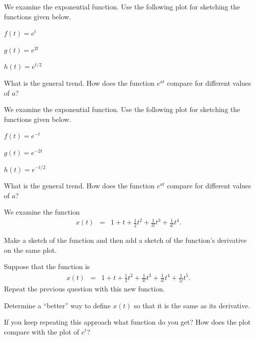 \begin{problem}
\item We examine the exponential function. Use the following plot for
  sketching the functions given below.

  \scalebox{0.75}{}

  \begin{subproblem}
  \item $f(t) = e^t$
  \item $g(t) = e^{2t}$
  \item $h(t) = e^{t/2}$
  \item What is the general trend. How does the function $e^{at}$
    compare for different values of $a$?
  \end{subproblem}

  \clearpage

\item We examine the exponential function. Use the following plot for
  sketching the functions given below.

  \scalebox{0.75}{}

  \begin{subproblem}
  \item $f(t) = e^{-t}$
  \item $g(t) = e^{-2t}$
  \item $h(t) = e^{-t/2}$
  \item What is the general trend. How does the function $e^{at}$
    compare for different values of $a$?
  \end{subproblem}


  \clearpage
\item We examine the function
  \begin{eqnarray*}
    x(t) & = & 1 + t + \frac{1}{2} t^2 + \frac{1}{3!} t^3 + \frac{1}{4!} t^4.
  \end{eqnarray*}
  \begin{subproblem}
  \item Make a sketch of the function and then add a sketch of the
    function's derivative on the same plot.
    \vfill
  \item Suppose that the function is   
    \begin{eqnarray*}
      x(t) & = & 1 + t + \frac{1}{2} t^2 + \frac{1}{3!} t^3 +
                 \frac{1}{4!} t^4 + \frac{1}{5!} t^5.
    \end{eqnarray*}
    Repeat the previous question with this new function. 
    \vfill

  \item Determine a ``better'' way to define $x(t)$ so that it is the
    same as its derivative. 
    \vfill

  \item If you keep repeating this approach what function do you get?
    How does the plot compare with the plot of $e^t$?
    \vspace{2em}
  \end{subproblem}
\end{problem}

